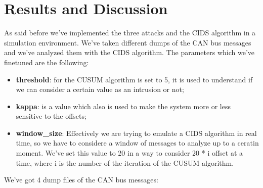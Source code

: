 \documentclass[12pt]{article}
\begin{document}
\section{Results and Discussion}
As said before we've implemented the three attacks and the CIDS algorithm in a simulation environment.
We've taken different dumps of the CAN bus messages and we've analyzed them with the CIDS algorithm. 
The parameters which we've finetuned are the following:
\begin{itemize}
    \item \textbf{threshold}: for the CUSUM algorithm is set to 5, it is used to understand if we can consider a certain 
    value as an intrusion or not;
    \item \textbf{kappa}: is a value which also is used to make the system more or less sensitive to the offsets;
    \item \textbf{window\_size}: Effectively we are trying to emulate a CIDS algorithm in real time, 
    so we have to considere a window of messages to analyze up to a ceratin moment. We've set this value to 
    20 in a way to consider 20 * i offset at a time, where i is the number of the iteration 
    of the CUSUM algorithm.
\end{itemize}
We've got 4 dump files of the CAN bus messages:
\end{document}
